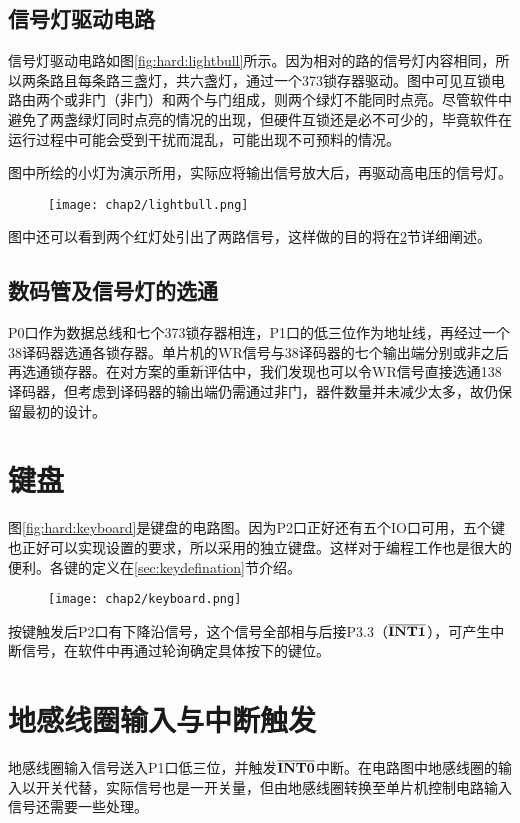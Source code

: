 	\subsection{信号灯驱动电路} \label{sec:hard:lightbull}
	信号灯驱动电路如图\ref{fig:hard:lightbull}所示。因为相对的路的信号灯内容相同，所以两条路且每条路三盏灯，共六盏灯，通过一个373锁存器驱动。图中可见互锁电路由两个或非门（非门）和两个与门组成，则两个绿灯不能同时点亮。尽管软件中避免了两盏绿灯同时点亮的情况的出现，但硬件互锁还是必不可少的，毕竟软件在运行过程中可能会受到干扰而混乱，可能出现不可预料的情况。
	
	图中所绘的小灯为演示所用，实际应将输出信号放大后，再驱动高电压的信号灯。
	\begin{figure}[!tbh]
	\centering
	\texttt{[image: chap2/lightbull.png]}
	\end{figure}
	
	图中还可以看到两个红灯处引出了两路信号，这样做的目的将在\ref{sec:hard:int0}节详细阐述。
	
	\subsection{数码管及信号灯的选通}
	P0口作为数据总线和七个373锁存器相连，P1口的低三位作为地址线，再经过一个38译码器选通各锁存器。单片机的WR信号与38译码器的七个输出端分别或非之后再选通锁存器。在对方案的重新评估中，我们发现也可以令WR信号直接选通138译码器，但考虑到译码器的输出端仍需通过非门，器件数量并未减少太多，故仍保留最初的设计。

\section{键盘}
	图\ref{fig:hard:keyboard}是键盘的电路图。因为P2口正好还有五个IO口可用，五个键也正好可以实现设置的要求，所以采用的独立键盘。这样对于编程工作也是很大的便利。各键的定义在\ref{sec:keydefination}节介绍。
	\begin{figure}[!tbh]
	\centering
	\texttt{[image: chap2/keyboard.png]}
	\end{figure}
	
	按键触发后P2口有下降沿信号，这个信号全部相与后接P3.3（$\bf \overline{INT1}$），可产生中断信号，在软件中再通过轮询确定具体按下的键位。
	
\section{地感线圈输入与中断触发} \label{sec:hard:int0}
	地感线圈输入信号送入P1口低三位，并触发$\bf \overline{INT0}$中断。在电路图中地感线圈的输入以开关代替，实际信号也是一开关量，但由地感线圈转换至单片机控制电路输入信号还需要一些处理。
	

